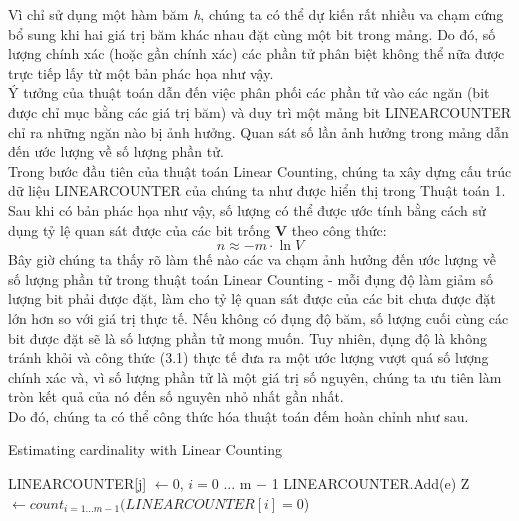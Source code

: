 \documentclass[a4paper,13pt]{article}
\theoremstyle{mytheor}
\begin{document}
\indent Vì chỉ sử dụng một hàm băm \textit{h}, chúng ta có thể dự kiến rất nhiều va chạm cứng bổ sung khi hai giá trị băm khác nhau đặt cùng một bit 
trong mảng. Do đó, số lượng chính xác (hoặc gần chính xác) các phần tử phân biệt không thể nữa được trực tiếp lấy từ một bản phác họa như vậy.\\
\indent Ý tưởng của thuật toán dẫn đến việc phân phối các phần tử vào các ngăn (bit được chỉ mục bằng các giá trị băm) và duy trì một mảng 
bit LINEARCOUNTER chỉ ra những ngăn nào bị ảnh hưởng. Quan sát số lần ảnh hưởng trong mảng dẫn đến ước lượng về số lượng phần tử.\\
\indent Trong bước đầu tiên của thuật toán Linear Counting, chúng ta xây dựng cấu trúc dữ liệu LINEARCOUNTER của chúng ta như được hiển thị trong 
Thuật toán 1. Sau khi có bản phác họa như vậy, số lượng có thể được ước tính bằng cách sử dụng tỷ lệ quan sát được của các bit trống \textbf{V} 
theo công thức:\\
\begin{equation}
    n \approx -m\cdot\ln V \tag{$3.1$}
\end{equation}
\indent Bây giờ chúng ta thấy rõ làm thế nào các va chạm ảnh hưởng đến ước lượng về số lượng phần tử trong thuật toán Linear Counting - mỗi đụng độ 
làm giảm số lượng bit phải được đặt, làm cho tỷ lệ quan sát được của các bit chưa được đặt lớn hơn so với giá trị thực tế. Nếu không có đụng độ băm, 
số lượng cuối cùng các bit được đặt sẽ là số lượng phần tử mong muốn. Tuy nhiên, đụng độ là không tránh khỏi và công thức (3.1) thực tế đưa ra một 
ước lượng vượt quá số lượng chính xác và, vì số lượng phần tử là một giá trị số nguyên, chúng ta ưu tiên làm tròn kết quả của nó đến số nguyên nhỏ nhất 
gần nhất.\\
\indent Do đó, chúng ta có thể công thức hóa thuật toán đếm hoàn chỉnh như sau.\\
\vspace{0.5cm}
\begin{algorithm}[H]
    \DontPrintSemicolon
    \LinesNumberedHidden
    \caption[]{Estimating cardinality with Linear Counting}
    LINEARCOUNTER[j] $\gets 0$, $i = 0$ ... m $- $ 1\;
     { LINEARCOUNTER.Add(e) }
    Z $\gets count_{i=1...m-1} (LINEARCOUNTER[i] = 0 $)\;
\end{algorithm}
\end{document}
